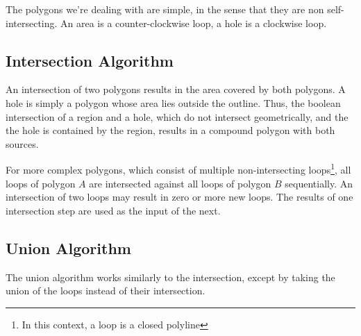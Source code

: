 \documentclass[12pt,a4paper,oneside,openany]{article}
\begin{document}
The polygons we're dealing with are simple, in the sense that they are non self-intersecting. An area is a counter-clockwise loop, a hole is a clockwise loop.

\subsection{Intersection Algorithm}

An intersection of two polygons results in the area covered by both polygons. A hole is simply a polygon whose area lies outside the outline. Thus, the boolean intersection of a region and a hole, which do not intersect geometrically, and the the hole is contained by the region, results in a compound polygon with both sources.

For more complex polygons, which consist of multiple non-intersecting loops\footnote{In this context, a loop is a closed polyline}, all loops of polygon $A$ are intersected against all loops of polygon $B$ sequentially. An intersection of two loops may result in zero or more new loops. The results of one intersection step are used as the input of the next.

\subsection{Union Algorithm}

The union algorithm works similarly to the intersection, except by taking the union of the loops instead of their intersection.



\nocite{*}



\end{document}
